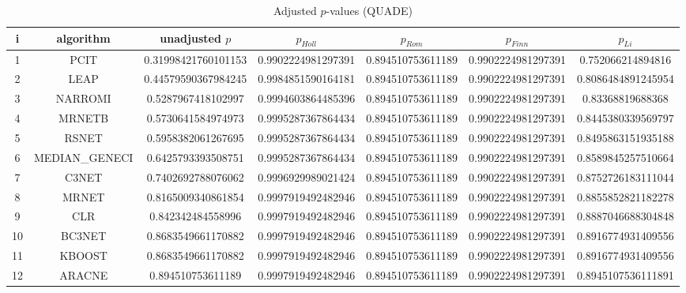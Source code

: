 \documentclass[a4paper,10pt]{article}
\begin{document}
\begin{landscape}
\begin{table}[!htp]
\centering\scriptsize
\caption{Adjusted $p$-values (QUADE)}
\begin{tabular}{ccccccc}
i&algorithm&unadjusted $p$&$p_{Holl}$&$p_{Rom}$&$p_{Finn}$&$p_{Li}$\\
\hline
1&PCIT&0.31998421760101153&0.9902224981297391&0.894510753611189&0.9902224981297391&0.752066214894816\\
2&LEAP&0.44579590367984245&0.9984851590164181&0.894510753611189&0.9902224981297391&0.8086484891245954\\
3&NARROMI&0.5287967418102997&0.9994603864485396&0.894510753611189&0.9902224981297391&0.83368819688368\\
4&MRNETB&0.5730641584974973&0.9995287367864434&0.894510753611189&0.9902224981297391&0.8445380339569797\\
5&RSNET&0.5958382061267695&0.9995287367864434&0.894510753611189&0.9902224981297391&0.8495863151935188\\
6&MEDIAN_GENECI&0.6425793393508751&0.9995287367864434&0.894510753611189&0.9902224981297391&0.8589845257510664\\
7&C3NET&0.7402692788076062&0.9996929989021424&0.894510753611189&0.9902224981297391&0.8752726183111044\\
8&MRNET&0.8165009340861854&0.9997919492482946&0.894510753611189&0.9902224981297391&0.8855852821182278\\
9&CLR&0.842342484558996&0.9997919492482946&0.894510753611189&0.9902224981297391&0.8887046688304848\\
10&BC3NET&0.8683549661170882&0.9997919492482946&0.894510753611189&0.9902224981297391&0.8916774931409556\\
11&KBOOST&0.8683549661170882&0.9997919492482946&0.894510753611189&0.9902224981297391&0.8916774931409556\\
12&ARACNE&0.894510753611189&0.9997919492482946&0.894510753611189&0.9902224981297391&0.8945107536111891\\
\hline
\end{tabular}
\end{table}

\end{landscape}
\end{document}
